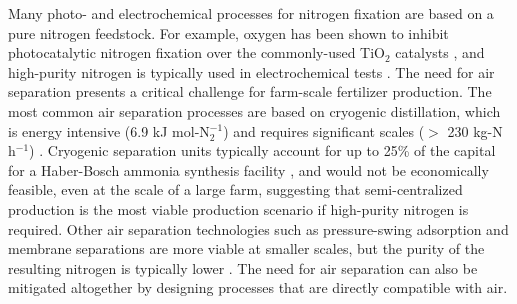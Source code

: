 Many photo- and electrochemical processes for nitrogen fixation are based on a pure nitrogen feedstock. For example, oxygen has been shown to inhibit photocatalytic nitrogen fixation over the commonly-used TiO$_2$ catalysts \cite{Hirakawa_2017}, and high-purity nitrogen is typically used in electrochemical tests \cite{Song_2018, lan2013synthesis,wang2018greening}. The need for air separation presents a critical challenge for farm-scale fertilizer production. The most common air separation processes are based on cryogenic distillation, which is energy intensive (6.9 kJ mol-N$_2^{-1}$) \cite{TANIGUCHI_2015} and requires significant scales ($>$ 230 kg-N h$^{-1}$) \cite{kirk_nitro_2005}. Cryogenic separation units typically account for up to 25\% of the capital for a Haber-Bosch ammonia synthesis facility \cite{Bartels}, and would not be economically feasible, even at the scale of a large farm, suggesting that semi-centralized production is the most viable production scenario if high-purity nitrogen is required. Other air separation technologies such as pressure-swing adsorption and membrane separations are more viable at smaller scales, but the purity of the resulting nitrogen is typically lower \cite{Smith_2001}. 
The need for air separation can also be mitigated altogether by designing processes that are directly compatible with air.

